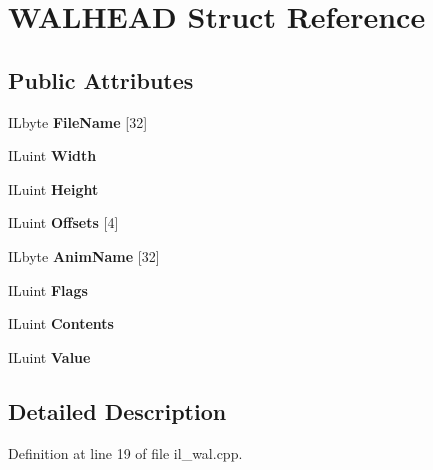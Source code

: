 \hypertarget{structWALHEAD}{}\section{W\+A\+L\+H\+E\+AD Struct Reference}
\label{structWALHEAD}
\subsection*{Public Attributes}
\begin{DoxyCompactItemize}
\item 
\mbox{\label{structWALHEAD_a39cc2325441045c7765cfad5952ebabc}} 
I\+Lbyte {\bfseries File\+Name} \mbox{[}32\mbox{]}
\item 
\mbox{\label{structWALHEAD_a9471e8d9cd176b03ae64b21cb6a0aa65}} 
I\+Luint {\bfseries Width}
\item 
\mbox{\label{structWALHEAD_a04a5d740832833ef604cd77df8ed7a54}} 
I\+Luint {\bfseries Height}
\item 
\mbox{\label{structWALHEAD_acf5eda49762620226415952b40699ea6}} 
I\+Luint {\bfseries Offsets} \mbox{[}4\mbox{]}
\item 
\mbox{\label{structWALHEAD_a203bd236a4ddbdc2e5381efd50190938}} 
I\+Lbyte {\bfseries Anim\+Name} \mbox{[}32\mbox{]}
\item 
\mbox{\label{structWALHEAD_aad5a583529ff06e448262f3f0bcf06f1}} 
I\+Luint {\bfseries Flags}
\item 
\mbox{\label{structWALHEAD_a68cc0f01b1613f1be5b2f43ebf9564a8}} 
I\+Luint {\bfseries Contents}
\item 
\mbox{\label{structWALHEAD_a6af1915a234d7fe69fd4c7489cd86969}} 
I\+Luint {\bfseries Value}
\end{DoxyCompactItemize}


\subsection{Detailed Description}


Definition at line 19 of file il\+\_\+wal.\+cpp.



